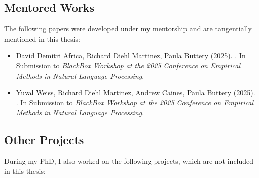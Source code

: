 \newpage

\begin{tcolorbox}[
    enhanced,
    colback=white,
    colframe=thesisblue,
    arc=0mm,
    boxrule=1pt,
    left=10pt,
    right=10pt,
    top=10pt,
    bottom=10pt,
    title=Additional Works,
    fonttitle=\bfseries,
    coltitle=white
]
\subsection*{Mentored Works}
The following papers were developed under my mentorship and are tangentially mentioned in this thesis:

\begin{itemize}
    \item David Demitri Africa, Richard Diehl Martinez, Paula Buttery (2025). {\color{thesisblue}{Examining the Performance Gap: Meta-Learning for Pretraining Small Language Models}}. In Submission to \emph{BlackBox Workshop at the 2025 Conference on Empirical Methods in Natural Language Processing}.
    \item Yuval Weiss, Richard Diehl Martinez, Andrew Caines, Paula Buttery (2025). {\color{thesisblue}{Investigating ReLoRA: Effects on the Learning Dynamics of Small Language Models}}. In Submission to \emph{BlackBox Workshop at the 2025 Conference on Empirical Methods in Natural Language Processing}.
\end{itemize}

\subsection*{Other Projects}
During my PhD, I also worked on the following projects, which are not included in this thesis:


\end{tcolorbox}
